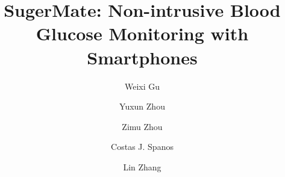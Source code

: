 \documentclass[acmlarge]{acmart}
\begin{document}
\title{SugerMate: Non-intrusive Blood Glucose Monitoring with Smartphones}

\author{Weixi Gu}
\author{Yuxun Zhou}
\author{Zimu Zhou}

\author{Costas J. Spanos}

\author{Lin Zhang}
\end{document}
